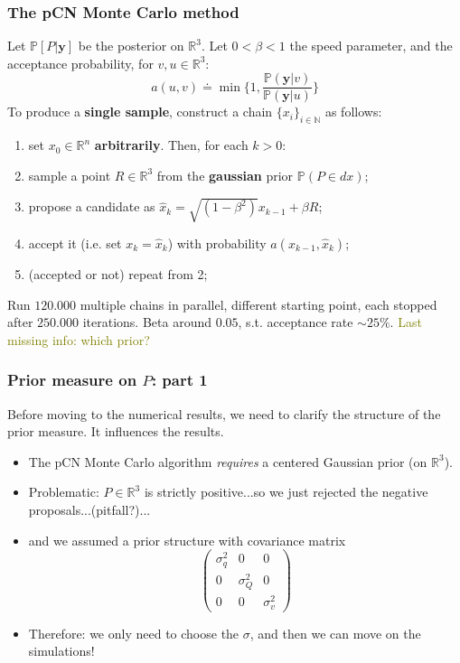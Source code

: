 \documentclass{beamer}
\begin{document}
\begin{frame}
	\frametitle{The pCN Monte Carlo method}
	Let $\mathbb{P}[P | \textbf{y}]$ be the posterior on $\mathbb{R}^3$.
	Let $0 < \beta < 1$ the speed parameter, and the acceptance
	probability, for $v, u \in \mathbb{R}^3$:
	\begin{equation}
		a(u, v) \doteq \min \{ 1, \frac{ \mathbb{P}(\textbf{y} | v )}
                                {\mathbb{P}(\textbf{y} | u)} \}
	\end{equation}
	To produce a \textbf{single sample}, construct a chain
	$\{ x_i \} _{i \in \mathbb{N} }$ as follows:

\begin{enumerate}
        \item set $x_0 \in \mathbb{R}^n$ \textbf{arbitrarily}. Then, for each
                $k > 0$:
        \item sample a point $R \in \mathbb{R}^3$
		from the \textbf{gaussian} prior $\mathbb{P}(P \in dx)$;

        \item  propose a candidate as
                $
                \hat{x}_{k} = \sqrt{(1 - \beta^2)} x_{k-1}
                        + \beta R
                $;
        \item   accept it (i.e. set $x_{k} = \hat{x}_{k}$)
                with probability $a(x_{k-1}, \hat{x}_k)$;
        \item (accepted or not) repeat from 2;
\end{enumerate}

	Run $120.000$ multiple chains in parallel, different starting point, 
	each stopped after $250.000$ iterations. Beta around $0.05$, s.t.
	acceptance rate $\sim 25\%$. 
	\textcolor{olive}{Last missing info: which prior?}
\end{frame}


\begin{frame}
	\frametitle{Prior measure on $P$: part 1}
	Before moving to the numerical results, we need to clarify the
	structure of the prior measure. It influences the results.
	\begin{itemize}
		\item <1-> The pCN Monte Carlo algorithm \emph{requires}
			a centered Gaussian prior (on $\mathbb{R}^3$).
		\item <2-> Problematic: $P \in \mathbb{R}^3$ 
			is strictly positive...so
			we just rejected the negative proposals...(pitfall?)...
		\item<3-> and we assumed a prior structure with covariance
			matrix
			\begin{equation}
				\begin{pmatrix}
			        \sigma_q^2 & 0 & 0 \\
    				    0 & \sigma_Q^2 & 0 \\
     				   0 & 0 & \sigma_v^2
			\end{pmatrix}
			\end{equation}
		\item <4-> Therefore: we only need to choose the $\sigma$,
			and then we can move on the simulations!
	\end{itemize}
\end{frame}
\end{document}
